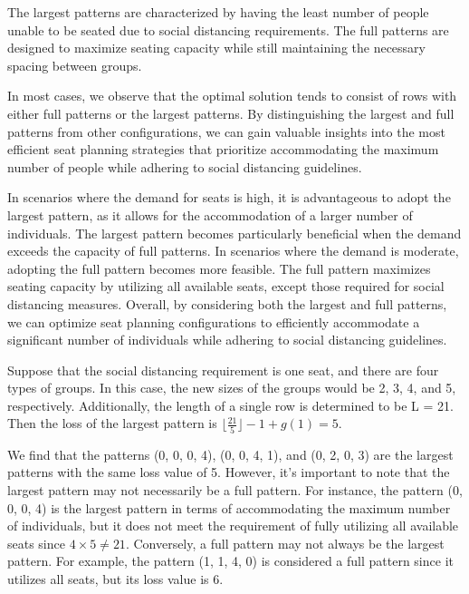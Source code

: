 The largest patterns are characterized by having the least number of people unable to be seated due to social distancing requirements. The full patterns are designed to maximize seating capacity while still maintaining the necessary spacing between groups. 

In most cases, we observe that the optimal solution tends to consist of rows with either full patterns or the largest patterns.
By distinguishing the largest and full patterns from other configurations, we can gain valuable insights into the most efficient seat planning strategies that prioritize accommodating the maximum number of people while adhering to social distancing guidelines.

In scenarios where the demand for seats is high, it is advantageous to adopt the largest pattern, as it allows for the accommodation of a larger number of individuals. The largest pattern becomes particularly beneficial when the demand exceeds the capacity of full patterns. In scenarios where the demand is moderate, adopting the full pattern becomes more feasible. The full pattern maximizes seating capacity by utilizing all available seats, except those required for social distancing measures. Overall, by considering both the largest and full patterns, we can optimize seat planning configurations to efficiently accommodate a significant number of individuals while adhering to social distancing guidelines.

\begin{example}
  Suppose that the social distancing requirement is one seat, and there are four types of groups. In this case, the new sizes of the groups would be 2, 3, 4, and 5, respectively. Additionally, the length of a single row is determined to be L = 21. Then the loss of the largest pattern is $\lfloor \frac{21}{5} \rfloor  - 1 + g(1) = 5$.
  
  We find that the patterns (0, 0, 0, 4), (0, 0, 4, 1), and (0, 2, 0, 3) are the largest patterns with the same loss value of 5. However, it's important to note that the largest pattern may not necessarily be a full pattern. For instance, the pattern (0, 0, 0, 4) is the largest pattern in terms of accommodating the maximum number of individuals, but it does not meet the requirement of fully utilizing all available seats since $4 \times 5 \neq 21$. Conversely, a full pattern may not always be the largest pattern. For example, the pattern (1, 1, 4, 0) is considered a full pattern since it utilizes all seats, but its loss value is 6.
\end{example}


